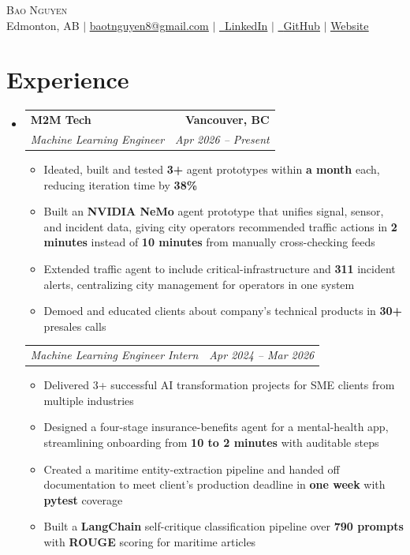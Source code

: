 \documentclass[letterpaper,11pt]{article}
\makeatletter
\newcommand{\resumeItem}[1]{
  \item\small{
    {#1 \vspace{-3pt}}
  }
}
\newcommand{\resumeSubheading}[4]{
  \vspace{-3pt}\item
    \begin{tabular*}{1.0\textwidth}[t]{l@{\extracolsep{\fill}}r}
      \textbf{#1} & \textbf{\small #2} \\
      \textit{\small#3} & \textit{\small #4} \\
    \end{tabular*}\vspace{-7pt}
}
\newcommand{\resumeSubheadingContinue}[2]{
  \vspace{-3pt}
    \begin{tabular*}{1.0\textwidth}[t]{l@{\extracolsep{\fill}}r}
      \textit{\small#1} & \textit{\small #2} \\
    \end{tabular*}\vspace{-7pt}
}
\newcommand{\resumeSubHeadingListStart}{\begin{itemize}[leftmargin=0.0in, label={}]}
\newcommand{\resumeSubHeadingListEnd}{\end{itemize}}
\newcommand{\resumeItemListStart}{\begin{itemize}}
\newcommand{\resumeItemListEnd}{\end{itemize}\vspace{0pt}}
\makeatother
\begin{document}
    \begin{center}
        {\Huge\scshape Bao Nguyen}
        \\[0.125cm]
        Edmonton, AB $|$
        \href{mailto:baotnguyen8@gmail.com}{\underline{baotnguyen8@gmail.com}} $|$
        \href{https://www.linkedin.com/in/bao-thanh-nguyen}{\faLinkedin\ \underline{LinkedIn}} $|$
        \href{https://github.com/BaoTNguyen}{\faGithub\ \underline{GitHub}} $|$
        \href{https://lnksy.bio/bao-nguyen}{\underline{Website}}
    \end{center}

\section{Experience}
    \resumeSubHeadingListStart
        \resumeSubheading
        {M2M Tech}{Vancouver, BC}
        {Machine Learning Engineer}{Apr 2026 -- Present}
            \resumeItemListStart
                \resumeItem{Ideated, built and tested \textbf{3+} agent prototypes within \textbf{a month} each, reducing iteration time by \textbf{38\%}}
                \resumeItem{Built an \textbf{NVIDIA NeMo} agent prototype that unifies signal, sensor, and incident data, giving city operators recommended traffic actions in \textbf{2 minutes} instead of \textbf{10 minutes} from manually cross-checking feeds}
                \resumeItem{Extended traffic agent to include critical-infrastructure and \textbf{311} incident alerts, centralizing city management for operators in one system}
                \resumeItem{Demoed and educated clients about company's technical products in \textbf{30+} presales calls}
            \resumeItemListEnd

            \resumeSubheadingContinue
            {Machine Learning Engineer Intern}{Apr 2024 -- Mar 2026}
            \resumeItemListStart
                \resumeItem{Delivered 3+ successful AI transformation projects for SME clients from multiple industries}
                \resumeItem{Designed a four-stage insurance-benefits agent for a mental-health app, streamlining onboarding from \textbf{10 to 2 minutes} with auditable steps}
                \resumeItem{Created a maritime entity-extraction pipeline and handed off documentation to meet client's production deadline in \textbf{one week} with \textbf{pytest} coverage}
                \resumeItem{Built a \textbf{LangChain} self-critique classification pipeline over \textbf{790 prompts} with \textbf{ROUGE} scoring for maritime articles}
            \resumeItemListEnd
    \resumeSubHeadingListEnd
\end{document}

